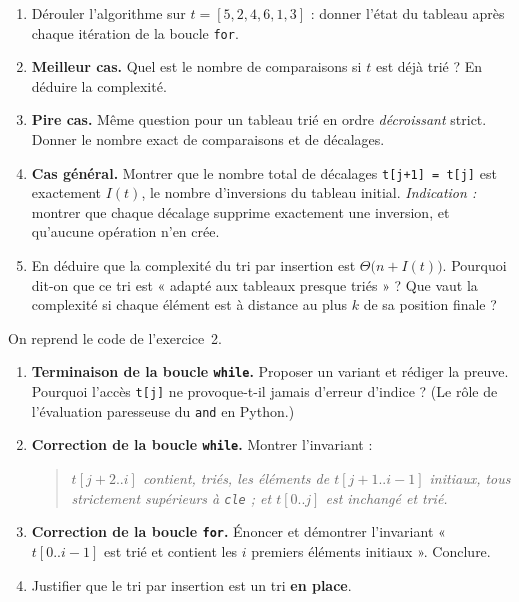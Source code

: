 \documentclass[11pt,a4paper]{article}
\begin{document}
\begin{enumerate}[label=\arabic*.,leftmargin=*]
  \item Dérouler l'algorithme sur $t=[5,2,4,6,1,3]$ : donner l'état du tableau après
        chaque itération de la boucle \texttt{for}.
  \item \textbf{Meilleur cas.} Quel est le nombre de comparaisons si $t$ est déjà trié ?
        En déduire la complexité.
  \item \textbf{Pire cas.} Même question pour un tableau trié en ordre \emph{décroissant}
        strict. Donner le nombre exact de comparaisons et de décalages.
  \item \textbf{Cas général.} Montrer que le nombre total de décalages
        \texttt{t[j+1] = t[j]} est exactement $I(t)$, le nombre d'inversions du tableau
        initial. \emph{Indication :} montrer que chaque décalage supprime exactement une
        inversion, et qu'aucune opération n'en crée.
  \item En déduire que la complexité du tri par insertion est
        $\Theta\big(n + I(t)\big)$. Pourquoi dit-on que ce tri est
        « adapté aux tableaux presque triés » ? Que vaut la complexité si chaque élément
        est à distance au plus $k$ de sa position finale ?
\end{enumerate}

On reprend le code de l'exercice~2.

\begin{enumerate}[label=\arabic*.,leftmargin=*]
  \item \textbf{Terminaison de la boucle \texttt{while}.} Proposer un variant et rédiger
        la preuve. Pourquoi l'accès \texttt{t[j]} ne provoque-t-il jamais d'erreur
        d'indice ? (Le rôle de l'évaluation paresseuse du \texttt{and} en Python.)
  \item \textbf{Correction de la boucle \texttt{while}.} Montrer l'invariant :
        \begin{quote}
          \emph{$t[j+2..i]$ contient, triés, les éléments de $t[j+1..i-1]$ initiaux, tous
          strictement supérieurs à \texttt{cle} ; et $t[0..j]$ est inchangé et trié.}
        \end{quote}
  \item \textbf{Correction de la boucle \texttt{for}.} Énoncer et démontrer l'invariant
        « $t[0..i-1]$ est trié et contient les $i$ premiers éléments initiaux ».
        Conclure.
  \item Justifier que le tri par insertion est un tri \textbf{en place}.
\end{enumerate}
\end{document}
